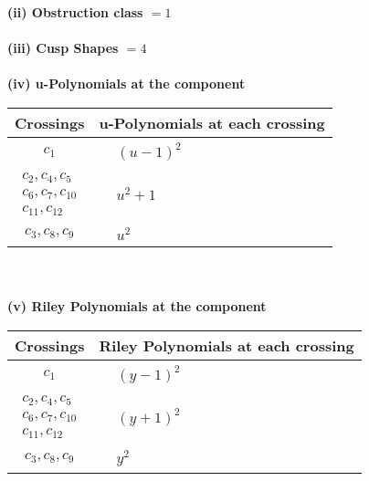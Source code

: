 \documentclass[1p]{elsarticle_modified}
\theoremstyle{definition}
\begin{document}
\flushleft \textbf{(ii) Obstruction class $= 1$}\\~\\
\flushleft \textbf{(iii) Cusp Shapes $= 4$}\\~\\
\newpage\renewcommand{\arraystretch}{1}
\flushleft \textbf{(iv) u-Polynomials at the component}\newline \\
\begin{tabular}{m{50pt}|m{274pt}}
Crossings & \hspace{64pt}u-Polynomials at each crossing \\
\hline $$\begin{aligned}c_{1}\end{aligned}$$&$\begin{aligned}
&(u-1)^2
\end{aligned}$\\
\hline $$\begin{aligned}c_{2},c_{4},c_{5}\\c_{6},c_{7},c_{10}\\c_{11},c_{12}\end{aligned}$$&$\begin{aligned}
&u^2+1
\end{aligned}$\\
\hline $$\begin{aligned}c_{3},c_{8},c_{9}\end{aligned}$$&$\begin{aligned}
&u^2
\end{aligned}$\\
\hline
\end{tabular}\\~\\
\newpage\renewcommand{\arraystretch}{1}
\flushleft \textbf{(v) Riley Polynomials at the component}\newline \\
\begin{tabular}{m{50pt}|m{274pt}}
Crossings & \hspace{64pt}Riley Polynomials at each crossing \\
\hline $$\begin{aligned}c_{1}\end{aligned}$$&$\begin{aligned}
&(y-1)^2
\end{aligned}$\\
\hline $$\begin{aligned}c_{2},c_{4},c_{5}\\c_{6},c_{7},c_{10}\\c_{11},c_{12}\end{aligned}$$&$\begin{aligned}
&(y+1)^2
\end{aligned}$\\
\hline $$\begin{aligned}c_{3},c_{8},c_{9}\end{aligned}$$&$\begin{aligned}
&y^2
\end{aligned}$\\
\hline
\end{tabular}\\~\\
\end{document}
